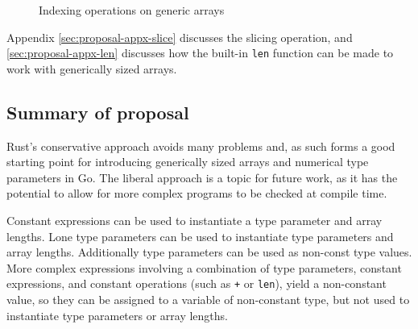 \begin{figure}
    \caption{Indexing operations on generic arrays}
\end{figure}

Appendix \ref{sec:proposal-appx-slice} discusses the slicing operation, and
\ref{sec:proposal-appx-len} discusses how the built-in \texttt{len} function can
be made to work with generically sized arrays.

\subsection{Summary of proposal}

Rust's conservative approach avoids many problems and, as such forms a good
starting point for introducing generically sized arrays and numerical type
parameters in Go. The liberal approach is a topic for future work, as it has the
potential to allow for more complex programs to be checked at compile time.

Constant expressions can be used to instantiate a  type parameter and
array lengths. Lone  type parameters can be used to instantiate
 type parameters and array lengths. Additionally  type
parameters can be used as non-const  type values. More complex
expressions involving a combination of type parameters, constant expressions,
and constant operations (such as \texttt{+} or \texttt{len}), yield a
non-constant  value, so they can be assigned to a variable of
non-constant  type, but not used to instantiate  type
parameters or array lengths.
